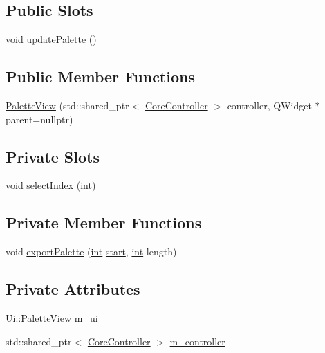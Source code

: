 \subsection*{Public Slots}
\begin{DoxyCompactItemize}
\item 
void \mbox{\hyperlink{class_q_g_b_a_1_1_palette_view_a4b523ba5286a8eb607a8b9295b22c009}{update\+Palette}} ()
\end{DoxyCompactItemize}
\subsection*{Public Member Functions}
\begin{DoxyCompactItemize}
\item 
\mbox{\hyperlink{class_q_g_b_a_1_1_palette_view_a79c74a1bfa468f32bc179dbc97d232ed}{Palette\+View}} (std\+::shared\+\_\+ptr$<$ \mbox{\hyperlink{class_q_g_b_a_1_1_core_controller}{Core\+Controller}} $>$ controller, Q\+Widget $\ast$parent=nullptr)
\end{DoxyCompactItemize}
\subsection*{Private Slots}
\begin{DoxyCompactItemize}
\item 
void \mbox{\hyperlink{class_q_g_b_a_1_1_palette_view_a80f9e5cbfa2a94ab352b3890225cc04f}{select\+Index}} (\mbox{\hyperlink{ioapi_8h_a787fa3cf048117ba7123753c1e74fcd6}{int}})
\end{DoxyCompactItemize}
\subsection*{Private Member Functions}
\begin{DoxyCompactItemize}
\item 
void \mbox{\hyperlink{class_q_g_b_a_1_1_palette_view_abcbc4ec67cdb645a624f559379c86d37}{export\+Palette}} (\mbox{\hyperlink{ioapi_8h_a787fa3cf048117ba7123753c1e74fcd6}{int}} \mbox{\hyperlink{tarith_8c_a7b8af9b9d992acd1d81caf9bb377f6c2a0e97c69c73117f6c0109b2d7d1d9cedc}{start}}, \mbox{\hyperlink{ioapi_8h_a787fa3cf048117ba7123753c1e74fcd6}{int}} length)
\end{DoxyCompactItemize}
\subsection*{Private Attributes}
\begin{DoxyCompactItemize}
\item 
Ui\+::\+Palette\+View \mbox{\hyperlink{class_q_g_b_a_1_1_palette_view_a6d688bfb46f8a4fd6fa8cd12b94cab1c}{m\+\_\+ui}}
\item 
std\+::shared\+\_\+ptr$<$ \mbox{\hyperlink{class_q_g_b_a_1_1_core_controller}{Core\+Controller}} $>$ \mbox{\hyperlink{class_q_g_b_a_1_1_palette_view_a7aee62cbec2c6337b920d04f0d9028ba}{m\+\_\+controller}}
\end{DoxyCompactItemize}


